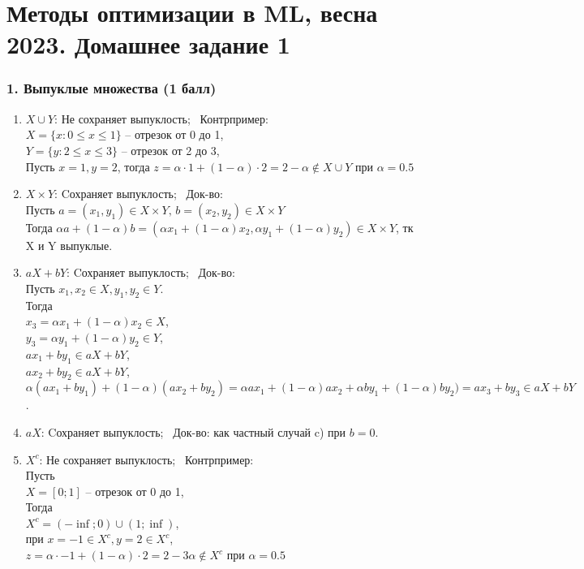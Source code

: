\documentclass{article}
\renewcommand{\leq}{\leqslant}  %
\begin{document}
\section*{Методы оптимизации в ML, весна 2023. Домашнее задание 1}
\subsubsection*{1. Выпуклые множества (1 балл)}
\begin{enumerate}[label=\alph*)]
  \item $X \cup Y$: Не сохраняет выпуклость; \, Контрпример:\\
      $X=\{x: 0 \leq x \leq 1\}$ -- отрезок от 0 до 1,\\
      $Y=\{y: 2 \leq x \leq 3\}$ -- отрезок от 2 до 3,\\
      Пусть $x=1, y=2$, тогда $z = \alpha \cdot 1 + (1 - \alpha) \cdot 2 = 2 - \alpha \notin X \cup Y$ 
      при $\alpha = 0.5$
  \item $X \times Y$: Cохраняет выпуклость; \, Док-во:\\
      Пусть $a=(x_1, y_1) \in X \times Y, \, b=(x_2, y_2) \in X \times Y$\\
      Тогда $\alpha a + (1 - \alpha) b = (\alpha x_1 + (1 - \alpha) x_2, \alpha y_1 + (1 - \alpha) y_2)
       \in X \times Y$, тк X и Y выпуклые.
  \item $aX + bY$: Cохраняет выпуклость; \, Док-во:\\
      Пусть $x_1, x_2 \in X, y_1, y_2 \in Y$.\\
      Тогда\\      
      $x_3 = \alpha x_1 + (1 - \alpha) x_2 \in X$,\\
      $y_3 = \alpha y_1 + (1 - \alpha) y_2 \in Y$,\\
      $a x_1 + b y_1 \in aX + bY$,\\
      $a x_2 + b y_2 \in aX + bY$,\\
      $\alpha (a x_1 + b y_1) + (1 - \alpha) (a x_2 + b y_2) = 
      \alpha a x_1 + (1 - \alpha) a x_2 + \alpha b y_1 + (1 - \alpha) b y_2) = 
      a x_3 + b y_3 \in aX + bY$.
  \item $aX$: Cохраняет выпуклость; \, Док-во: как частный случай c) при $b = 0$.
  \item $X^c$: Не сохраняет выпуклость; \, Контрпример:\\
      Пусть\\
      $X=[0;1]$ -- отрезок от 0 до 1,\\
      Тогда\\
      $X^c=(-\inf;0) \cup (1;\inf)$,\\
      при $x=-1 \in X^c, y=2 \in X^c$,\\ 
      $z = \alpha \cdot -1 + (1 - \alpha) \cdot 2 = 2 - 3 \alpha \notin X^c$ 
      при $\alpha = 0.5$
\end{enumerate}
\end{document}
